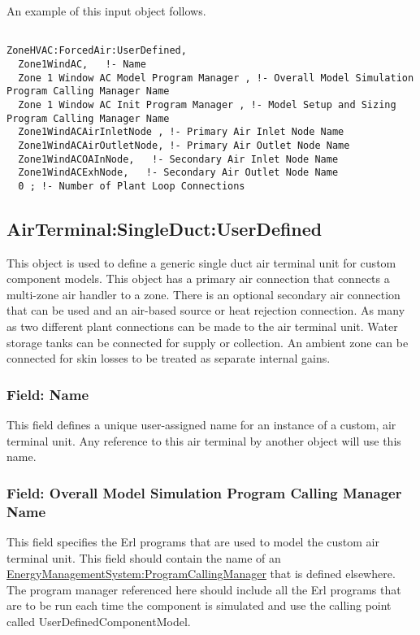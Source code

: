 An example of this input object follows.

\begin{lstlisting}

ZoneHVAC:ForcedAir:UserDefined,
  Zone1WindAC,   !- Name
  Zone 1 Window AC Model Program Manager , !- Overall Model Simulation Program Calling Manager Name
  Zone 1 Window AC Init Program Manager , !- Model Setup and Sizing Program Calling Manager Name
  Zone1WindACAirInletNode , !- Primary Air Inlet Node Name
  Zone1WindACAirOutletNode, !- Primary Air Outlet Node Name
  Zone1WindACOAInNode,   !- Secondary Air Inlet Node Name
  Zone1WindACExhNode,   !- Secondary Air Outlet Node Name
  0 ; !- Number of Plant Loop Connections
\end{lstlisting}

\subsection{AirTerminal:SingleDuct:UserDefined}\label{airterminalsingleductuserdefined}

This object is used to define a generic single duct air terminal unit for custom component models. This object has a primary air connection that connects a multi-zone air handler to a zone. There is an optional secondary air connection that can be used and an air-based source or heat rejection connection. As many as two different plant connections can be made to the air terminal unit. Water storage tanks can be connected for supply or collection. An ambient zone can be connected for skin losses to be treated as separate internal gains.

\subsubsection{Field: Name}\label{field-name-1-046}

This field defines a unique user-assigned name for an instance of a custom, air terminal unit. Any reference to this air terminal by another object will use this name.

\subsubsection{Field: Overall Model Simulation Program Calling Manager Name}\label{field-overall-model-simulation-program-calling-manager-name-1}

This field specifies the Erl programs that are used to model the custom air terminal unit. This field should contain the name of an \hyperref[energymanagementsystemprogramcallingmanager]{EnergyManagementSystem:ProgramCallingManager} that is defined elsewhere. The program manager referenced here should include all the Erl programs that are to be run each time the component is simulated and use the calling point called UserDefinedComponentModel.

